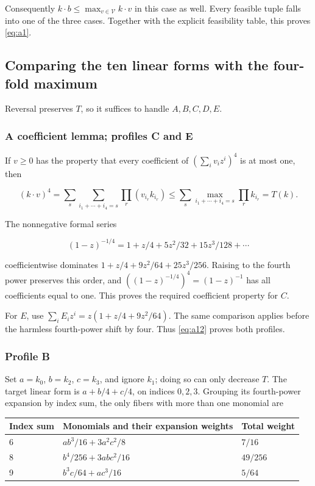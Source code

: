 Consequently \(k\cdot b\le\max_{v\in\mathcal V}k\cdot v\) in this case
as well. Every feasible tuple falls into one of the three cases. Together with
the explicit feasibility table, this proves \eqref{eq:a1}.

\subsection{Comparing the ten linear forms with the four-fold maximum}

Reversal preserves \(T\), so it suffices to handle \(A,B,C,D,E\).

\subsubsection{A coefficient lemma; profiles C and E}

If \(v\ge0\) has the property that every coefficient of
\((\sum_i v_i z^i)^4\) is at most one, then

\begin{equation}\label{eq:a12}
(k\cdot v)^4
=\sum_s\sum_{i_1+\cdots+i_4=s}\prod_r(v_{i_r}k_{i_r})
\le\sum_s\max_{i_1+\cdots+i_4=s}\prod_r k_{i_r}=T(k).
\end{equation}

The nonnegative formal series

\[
(1-z)^{-1/4}=1+z/4+5z^2/32+15z^3/128+\cdots
\]

coefficientwise dominates
\(1+z/4+9z^2/64+25z^3/256\). Raising to the fourth power preserves this
order, and \(((1-z)^{-1/4})^4=(1-z)^{-1}\) has all coefficients equal to
one. This proves the required coefficient property for \(C\).

For \(E\), use
\(\sum_i E_i z^i=z(1+z/4+9z^2/64)\). The same comparison applies before
the harmless fourth-power shift by four. Thus \eqref{eq:a12} proves both profiles.

\subsubsection{Profile B}

Set \(a=k_0\), \(b=k_2\), \(c=k_3\), and ignore \(k_1\); doing so can
only decrease \(T\). The target linear form is \(a+b/4+c/4\), on indices
\(0,2,3\). Grouping its fourth-power expansion by index sum, the only fibers
with more than one monomial are

\begin{center}
\begin{tabular}{lll}
\toprule
Index sum & Monomials and their expansion weights & Total weight\\
\midrule
6 & \(ab^3/16+3a^2c^2/8\) & \(7/16\)\\
8 & \(b^4/256+3abc^2/16\) & \(49/256\)\\
9 & \(b^3c/64+ac^3/16\) & \(5/64\)\\
\bottomrule
\end{tabular}
\end{center}

